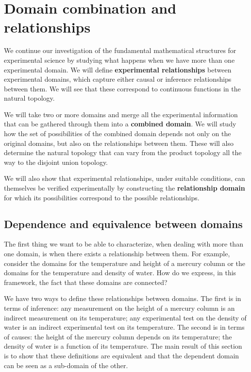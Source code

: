 \documentclass[11pt,letterpaper,fleqn]{memoir} %
\begin{document}
\chapter{Domain combination and relationships}

We continue our investigation of the fundamental mathematical structures for experimental science by studying what happens when we have more than one experimental domain. We will define \textbf{experimental relationships} between experimental domains, which capture either causal or inference relationships between them. We will see that these correspond to continuous functions in the natural topology.

We will take two or more domains and merge all the experimental information that can be gathered through them into a \textbf{combined domain}. We will study how the set of possibilities of the combined domain depends not only on the original domains, but also on the relationships between them. These will also determine the natural topology that can vary from the product topology all the way to the disjoint union topology.

We will also show that experimental relationships, under suitable conditions, can themselves be verified experimentally by constructing the \textbf{relationship domain} for which its possibilities correspond to the possible relationships.

\section{Dependence and equivalence between domains}

The first thing we want to be able to characterize, when dealing with more than one domain, is when there exists a relationship between them. For example, consider the domains for the temperature and height of a mercury column or the domains for the temperature and density of water. How do we express, in this framework, the fact that these domains are connected?

We have two ways to define these relationships between domains. The first is in terms of inference: any measurement on the height of a mercury column is an indirect measurement on its temperature; any experimental test on the density of water is an indirect experimental test on its temperature. The second is in terms of causes: the height of the mercury column depends on its temperature; the density of water is a function of its temperature. The main result of this section is to show that these definitions are equivalent and that the dependent domain can be seen as a sub-domain of the other.
\end{document}
